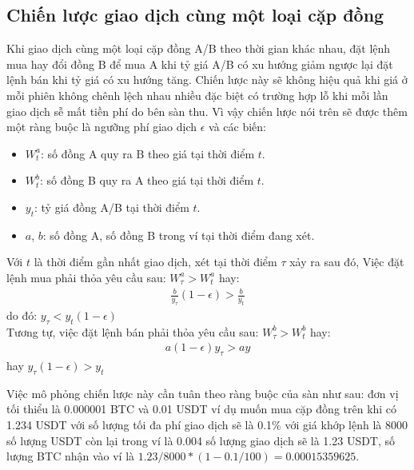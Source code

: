 \subsection{Chiến lược giao dịch cùng một loại cặp đồng}\label{describe_strategy_1}
Khi giao dịch cùng một loại cặp đồng A/B theo thời gian khác nhau, đặt lệnh mua hay đổi đồng B để mua A khi tỷ giá A/B có xu hướng giảm ngược lại đặt lệnh bán khi tỷ giá có xu hướng tăng. Chiến lược này sẽ không hiệu quả khi giá ở mỗi phiên không chênh lệch nhau nhiều đặc biệt có trường hợp lỗ khi mỗi lần giao dịch sễ mất tiền phí do bên sàn thu. Vì vậy chiến lược nói trên sẽ được thêm một ràng buộc là  ngưỡng phí giao dịch $\epsilon$ và các biến:
\begin{itemize}
    \item $W^a_t$: số đồng A quy ra B theo giá tại thời điểm $t$.
    \item $W^b_t$: số đồng B quy ra A theo giá tại thời điểm $t$.
    \item $y_t$: tỷ giá đồng A/B tại thời điểm $t$.
    \item $a$, $b$: số đồng A, số đồng B trong ví tại thời điểm đang xét.
\end{itemize}
Với $t$ là thời điểm gần nhất giao dịch, xét tại thời điểm $\tau$ xảy ra sau đó, Việc đặt lệnh mua phải thỏa yêu cầu sau:
$W^a_\tau > W^a_t$ hay:
\begin{align}
 \frac{b}{y_\tau}(1-\epsilon) > \frac{b}{y_t}   
\end{align}
do đó: $y_\tau < y_t(1 -\epsilon)$  \\
Tương tự, việc đặt lệnh bán phải thỏa yêu cầu sau:
$W^b_\tau > W^b_t$ hay:
\begin{align}
 a (1 - \epsilon) y_\tau > ay   
\end{align}
hay $y_\tau(1 -\epsilon) > y_t $

Việc mô phỏng chiến lược này cần tuân theo ràng buộc của sàn như sau: đơn vị tối thiểu là 0.000001 BTC và 0.01 USDT ví dụ muốn mua cặp đồng trên khi có 1.234 USDT với số lượng tối đa phí giao dịch sẽ là 0.1\% với giá khớp lệnh là 8000 số lượng USDT còn lại trong ví là 0.004 số lượng giao dịch sẽ là 1.23 USDT, số lượng BTC nhận vào ví là $1.23/8000*(1-0.1/100) = 0.00015359625$.


 
